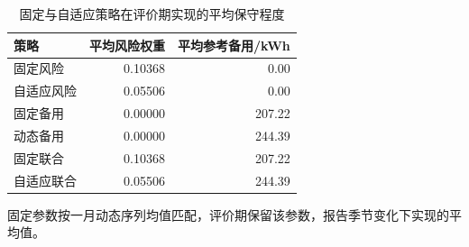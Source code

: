 \begin{table}[htbp]\centering\small
\caption{固定与自适应策略在评价期实现的平均保守程度}
\label{tab:v2_conservatism}
\begin{tabularx}{\linewidth}{LRR}\toprule
策略 & 平均风险权重 & 平均参考备用/kWh\\\midrule
固定风险 & 0.10368 & 0.00\\
自适应风险 & 0.05506 & 0.00\\
固定备用 & 0.00000 & 207.22\\
动态备用 & 0.00000 & 244.39\\
固定联合 & 0.10368 & 207.22\\
自适应联合 & 0.05506 & 244.39\\
\bottomrule\end{tabularx}
\par\smallskip\parbox{\linewidth}{\footnotesize 固定参数按一月动态序列均值匹配，评价期保留该参数，报告季节变化下实现的平均值。}
\end{table}
